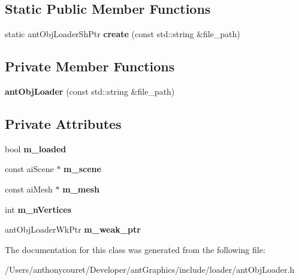 \subsection*{Static Public Member Functions}
\begin{DoxyCompactItemize}
\item 
\hypertarget{classant_obj_loader_a92320806fcb86a263ba9b8d18bf981a3}{static ant\+Obj\+Loader\+Sh\+Ptr {\bfseries create} (const std\+::string \&file\+\_\+path)}\label{classant_obj_loader_a92320806fcb86a263ba9b8d18bf981a3}

\end{DoxyCompactItemize}
\subsection*{Private Member Functions}
\begin{DoxyCompactItemize}
\item 
\hypertarget{classant_obj_loader_a24d0e1dcd6069e7c13a822b1c42f980b}{{\bfseries ant\+Obj\+Loader} (const std\+::string \&file\+\_\+path)}\label{classant_obj_loader_a24d0e1dcd6069e7c13a822b1c42f980b}

\end{DoxyCompactItemize}
\subsection*{Private Attributes}
\begin{DoxyCompactItemize}
\item 
\hypertarget{classant_obj_loader_a346b1aff15e82516b09702a8eed63fa2}{bool {\bfseries m\+\_\+loaded}}\label{classant_obj_loader_a346b1aff15e82516b09702a8eed63fa2}

\item 
\hypertarget{classant_obj_loader_ab415218f6df9eb35bf15668f8d461644}{const ai\+Scene $\ast$ {\bfseries m\+\_\+scene}}\label{classant_obj_loader_ab415218f6df9eb35bf15668f8d461644}

\item 
\hypertarget{classant_obj_loader_ac98e373d38608b64a5bcce904b3e0451}{const ai\+Mesh $\ast$ {\bfseries m\+\_\+mesh}}\label{classant_obj_loader_ac98e373d38608b64a5bcce904b3e0451}

\item 
\hypertarget{classant_obj_loader_a57832a9c805c0efd9a307147ed00ae8c}{int {\bfseries m\+\_\+n\+Vertices}}\label{classant_obj_loader_a57832a9c805c0efd9a307147ed00ae8c}

\item 
\hypertarget{classant_obj_loader_aba3b7466d22a4b247e5635cdc27c49d8}{ant\+Obj\+Loader\+Wk\+Ptr {\bfseries m\+\_\+weak\+\_\+ptr}}\label{classant_obj_loader_aba3b7466d22a4b247e5635cdc27c49d8}

\end{DoxyCompactItemize}


The documentation for this class was generated from the following file\+:\begin{DoxyCompactItemize}
\item 
/\+Users/anthonycouret/\+Developer/ant\+Graphics/include/loader/ant\+Obj\+Loader.\+h\end{DoxyCompactItemize}
